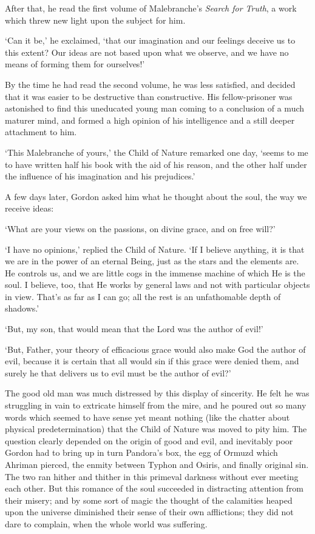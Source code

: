 \documentclass{article}
\begin{document}
\begin{center}
After that, he read the first volume of Malebranche's \textit{Search for Truth}, 
a work which threw new light upon the subject for him. 

`Can it be,' he exclaimed, `that our imagination and our feelings deceive us to 
this extent? Our ideas are not based upon what we observe, and we have no means 
of forming them for ourselves!' 

By the time he had read the second volume, he was less satisfied, and decided that 
it was easier to be destructive than constructive. His fellow-prisoner was astonished 
to find this uneducated young man coming to a conclusion of a much maturer mind, 
and formed a high opinion of his intelligence and a still deeper attachment to 
him. 

`This Malebranche of yours,' the Child of Nature remarked one day, `seems to me 
to have written half his book with the aid of his reason, and the other half under 
the influence of his imagination and his prejudices.' 

A few days later, Gordon asked him what he thought about the soul, the way we receive 
ideas: 

`What are your views on the passions, on divine grace, and on free will?' 

`I have no opinions,' replied the Child of Nature. `If I believe anything, it is 
that we are in the power of an eternal Being, just as the stars and the elements 
are. He controls us, and we are little cogs in the immense machine of which He 
is the soul. I believe, too, that He works by general laws and not with particular 
objects in view. That's as far as I can go; all the rest is an unfathomable depth 
of shadows.' 

`But, my son, that would mean that the Lord was the author of evil!' 

`But, Father, your theory of efficacious grace would also make God the author of 
evil, because it is certain that all would sin if this grace were denied them, 
and surely he that delivers us to evil must be the author of evil?' 

The good old man was much distressed by this display of sincerity. He felt he was 
struggling in vain to extricate himself from the mire, and he poured out so many 
words which seemed to have sense yet meant nothing (like the chatter about physical 
predetermination) that the Child of Nature was moved to pity him. The question 
clearly depended on the origin of good and evil, and inevitably poor Gordon had 
to bring up in turn Pandora's box, the egg of Ormuzd which Ahriman pierced, the 
enmity between Typhon and Osiris, and finally original sin. The two ran hither 
and thither in this primeval darkness without ever meeting each other. But this 
romance of the soul succeeded in distracting attention from their misery; and by 
some sort of magic the thought of the calamities heaped upon the universe diminished 
their sense of their own afflictions; they did not dare to complain, when the whole 
world was suffering. 


\end{center}
\end{document}
